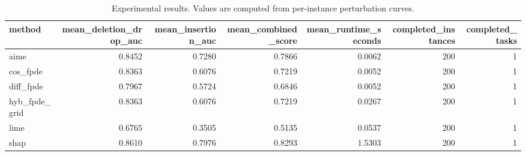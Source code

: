 \begin{table}[t]
\caption{Experimental results. Values are computed from per-instance perturbation curves.}
\label{tab:main_results_computed}
\centering
\begin{tabular}{lrrrrrr}
\toprule
method & mean\_deletion\_drop\_auc & mean\_insertion\_auc & mean\_combined\_score & mean\_runtime\_seconds & completed\_instances & completed\_tasks \\
\midrule
aime & 0.8452 & 0.7280 & 0.7866 & 0.0062 & 200 & 1 \\
cos\_fpde & 0.8363 & 0.6076 & 0.7219 & 0.0052 & 200 & 1 \\
diff\_fpde & 0.7967 & 0.5724 & 0.6846 & 0.0052 & 200 & 1 \\
hyb\_fpde\_grid & 0.8363 & 0.6076 & 0.7219 & 0.0267 & 200 & 1 \\
lime & 0.6765 & 0.3505 & 0.5135 & 0.0537 & 200 & 1 \\
shap & 0.8610 & 0.7976 & 0.8293 & 1.5303 & 200 & 1 \\
\bottomrule
\end{tabular}

\end{table}
